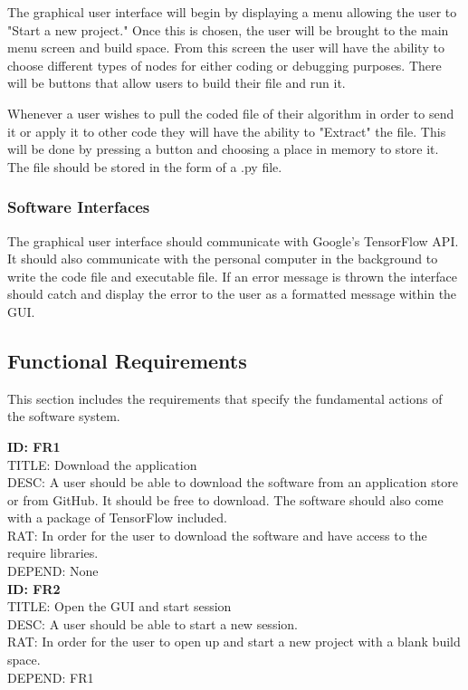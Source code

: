 \documentclass[journal,10pt,onecolumn,compsoc]{IEEEtran} \usepackage[margin=1.0in]{geometry} \usepackage{pdfpages} \usepackage{graphicx}
\begin{document}
The graphical user interface will begin by displaying a menu allowing the user to "Start a new project."
Once this is chosen, the user will be brought to the main menu screen and build space.
From this screen the user will have the ability to choose different types of nodes for either coding or debugging purposes.
There will be buttons that allow users to build their file and run it.

Whenever a user wishes to pull the coded file of their algorithm in order to send it or apply it to other code they will have the ability to "Extract" the file.
This will be done by pressing a button and choosing a place in memory to store it. 
The file should be stored in the form of a .py file.

\subsubsection{Software Interfaces}

The graphical user interface should communicate with Google's TensorFlow API.
It should also communicate with the personal computer in the background to write the code file and executable file.
If an error message is thrown the interface should catch and display the error to the user as a formatted message within the GUI.

\subsection{Functional Requirements}

This section includes the requirements that specify the fundamental actions of the software system.

\noindent
\textbf{ID: FR1}\\
TITLE: Download the application\\
DESC: A user should be able to download the software from an application store or from GitHub. It should be free to download. 
The software should also come with a package of TensorFlow included.\\
RAT: In order for the user to download the software and have access to the require libraries.\\
DEPEND: None\\

\noindent
\textbf{ID: FR2}\\
TITLE: Open the GUI and start session\\
DESC: A user should be able to start a new session. \\
RAT: In order for the user to open up and start a new project with a blank build space.\\
DEPEND: FR1\\
\end{document}
